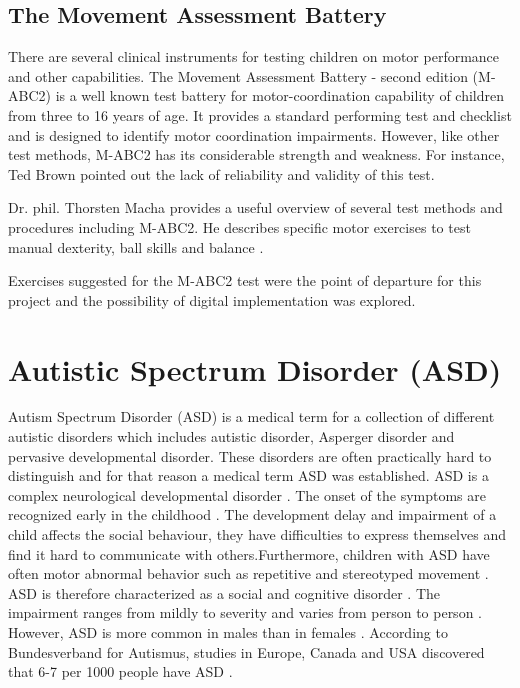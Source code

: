 

\subsection{The Movement Assessment Battery}
There are several clinical instruments for testing children on motor performance and other capabilities. The Movement Assessment Battery - second edition (M-ABC2) is a well known test battery for motor-coordination capability of children from three to 16 years of age. It provides a standard performing test and checklist and is designed to identify motor coordination impairments. However, like other test methods, M-ABC2 has its considerable strength and weakness. For instance, Ted Brown \cite{Brown2009} pointed out the lack of reliability and validity of this test.

Dr. phil. Thorsten Macha provides a useful overview of several test methods and procedures including M-ABC2. He describes specific motor exercises to test manual dexterity, ball skills and balance \cite{Macha2010}.

Exercises suggested for the M-ABC2 test were the point of departure for this project and the possibility of digital implementation was explored.








\section{Autistic Spectrum Disorder (ASD)}
\label{sec:asd}

Autism Spectrum Disorder (ASD) is a medical term for a collection of different autistic disorders which includes autistic disorder, Asperger disorder and pervasive developmental disorder. These disorders are often practically hard to distinguish and for that reason a medical term ASD was established.  ASD is a complex neurological developmental disorder \cite{BundesverbandAutismusDeutschland}. The onset of the symptoms are recognized early in the childhood \cite{NationalInstituteofMentalHealth}. The development delay and impairment of a child affects the social behaviour, they have difficulties to express themselves and find it hard to communicate with others.Furthermore, children with ASD have often motor abnormal behavior such as repetitive and stereotyped movement \cite{McCleery2013,Lloyd2013}.  ASD is therefore characterized as a social and cognitive disorder \cite{Whyatt2013}. The impairment ranges from mildly to severity and varies from person to person \cite{NationalInstituteofMentalHealth}. However, ASD is more common in males than in females \cite{Ecker2017}. According to Bundesverband for Autismus, studies in Europe, Canada and USA discovered that 6-7 per 1000 people have ASD \cite{BundesverbandAutismusDeutschland}. 



